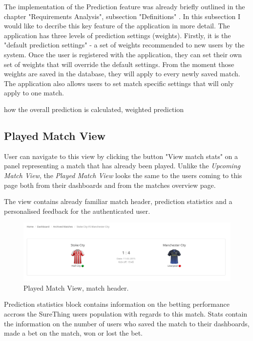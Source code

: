 The implementation of the Prediction feature was already briefly outlined in the chapter "Requirements Analysis", subsection "Definitions" \cite{subsec:definitions}. In this subsection I would like to decribe this key feature of the application in more detail. The application has three levels of prediction settings (weights). Firstly, it is the "default prediction settings" - a set of weights recommended to new users by the system. Once the user is registered with the application, they can set their own set of weights that will override the default settings. From the moment those weights are saved in the database, they will apply to every newly saved match. The application also allows users to set match specific settings that will only apply to one match. 
 


how the overall prediction is calculated, weighted prediction

\subsection{Played Match View}
\label{subsec:playedmatchview}
User can navigate to this view by clicking the button "View match stats" on a panel representing a match that has already been played. Unlike the \emph{Upcoming Match View}, the \emph{Played Match View} looks the same to the users coming to this page both from their dashboards and from the matches overview page. 

The view contains already familiar match header, prediction statistics and a personalised feedback for the authenticated user. 

\begin{figure}[H]
	\begin{center}
		\includegraphics[width=.90\textwidth]{impl/images/matchHeader}
		\caption{Played Match View, match header.} \label{fig:matchheader}
	\end{center}
\end{figure}

Prediction statistics block contains information on the betting performance accross the SureThing users population with regards to this match. Stats contain the information on the number of users who saved the match to their dashboards, made a bet on the match, won or lost the bet. 


